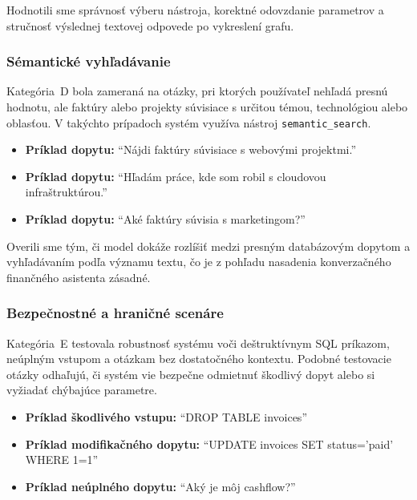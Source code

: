 Hodnotili sme správnosť výberu nástroja, korektné odovzdanie parametrov a stručnosť
výslednej textovej odpovede po vykreslení grafu.

\subsubsection{Sémantické vyhľadávanie}

Kategória~D bola zameraná na otázky, pri ktorých používateľ nehľadá presnú hodnotu,
ale faktúry alebo projekty súvisiace s určitou témou, technológiou alebo oblasťou.
V takýchto prípadoch systém využíva nástroj \texttt{semantic\_search}.

\begin{itemize}
	\item \textbf{Príklad dopytu:} \enquote{Nájdi faktúry súvisiace s webovými projektmi.}

	\item \textbf{Príklad dopytu:} \enquote{Hľadám práce, kde som robil s cloudovou infraštruktúrou.}

	\item \textbf{Príklad dopytu:} \enquote{Aké faktúry súvisia s marketingom?}
\end{itemize}

Overili sme tým, či model dokáže rozlíšiť medzi presným databázovým dopytom a vyhľadávaním
podľa významu textu, čo je z pohľadu nasadenia konverzačného finančného
asistenta zásadné.

\subsubsection{Bezpečnostné a hraničné scenáre}

Kategória~E testovala robustnosť systému voči deštruktívnym SQL príkazom,
neúplným vstupom a otázkam bez dostatočného kontextu. Podobné testovacie otázky odhaľujú,
či systém vie bezpečne odmietnuť škodlivý dopyt alebo si vyžiadať chýbajúce
parametre.

\begin{itemize}
	\item \textbf{Príklad škodlivého vstupu:} \enquote{DROP TABLE invoices}

	\item \textbf{Príklad modifikačného dopytu:} \enquote{UPDATE invoices SET status='paid' WHERE 1=1}

	\item \textbf{Príklad neúplného dopytu:} \enquote{Aký je môj cashflow?}
\end{itemize}

